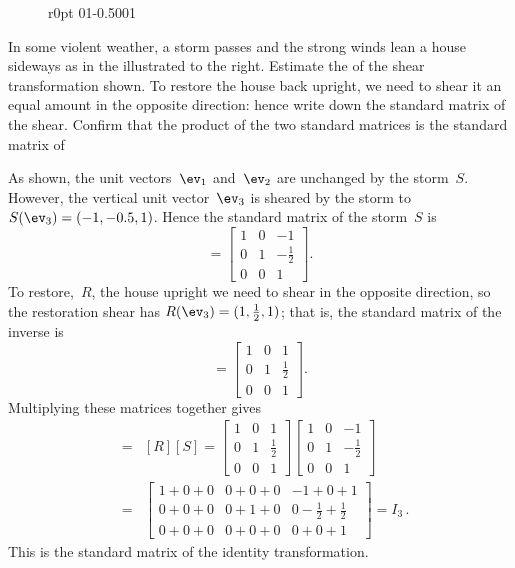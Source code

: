 \begin{wrapfigure}[8]r{0pt}
\def\unithousesize{small}
01{-0.5}001
\end{wrapfigure}
\begin{example} \label{eg:stormLT}
In some violent weather, a storm passes and the strong winds lean a house sideways as in the  illustrated to the right.
Estimate the  of the shear transformation shown.
To restore the house back upright, we need to shear it an equal amount in the opposite direction: hence write down the standard matrix of the  shear.
Confirm that the product of the two standard matrices is the standard matrix of 
\begin{solution} 
As shown, the unit vectors~\(\ev_1\) and~\(\ev_2\) are unchanged by the storm~\(S\).  
However, the vertical unit vector~\(\ev_3\) is sheared by the storm to \(S(\ev_3)=(-1,-0.5,1)\).
Hence the standard matrix of the storm~\(S\) is
\begin{equation*}
[S]=\begin{bmatrix} 1&0&-1\\0&1&-\tfrac12\\0&0&1 \end{bmatrix}.
\end{equation*}
To restore,~\(R\), the house upright we need to shear in the opposite direction, so the restoration shear has \(R(\ev_3)=(1,\tfrac12,1)\); that is, the standard matrix of the inverse is
\begin{equation*}
[R]=\begin{bmatrix} 1&0&1\\0&1&\tfrac12\\0&0&1 \end{bmatrix}.
\end{equation*}
Multiplying these matrices together gives
\begin{eqnarray*}
[R\circ S]&=&[R][S]
=\begin{bmatrix} 1&0&1\\0&1&\tfrac12\\0&0&1 \end{bmatrix}
\begin{bmatrix} 1&0&-1\\0&1&-\tfrac12\\0&0&1 \end{bmatrix}
\\&=&\begin{bmatrix} 1+0+0&0+0+0&-1+0+1\\
0+0+0&0+1+0&0-\tfrac12+\tfrac12\\
0+0+0&0+0+0&0+0+1 \end{bmatrix}
=I_3\,.
\end{eqnarray*}
This is the standard matrix of the identity transformation.
\end{solution}
\end{example}



